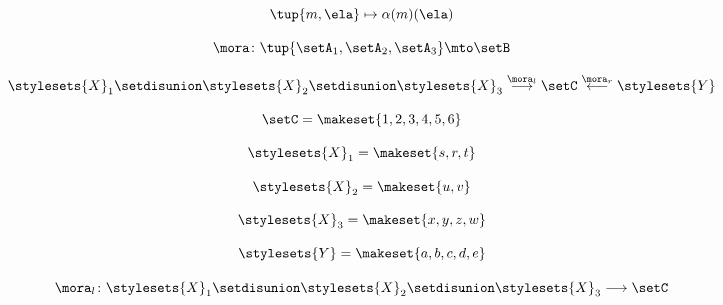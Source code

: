{\begin{forslides}
        \begin{equation}
            \label{eq:slides_multicategories_54}
            \tup{m, \ela} \mapsto \alpha(m)(\ela)
        \end{equation}

        \begin{equation}
            \label{eq:slides_multicategories_55}
            \mora \colon \tup{\setA_1, \setA_2, \setA_3} \mto \setB
        \end{equation}

        \begin{equation}
            \label{eq:slides_multicategories_56}
            \stylesets{X}_1 \setdisunion  \stylesets{X}_2 \setdisunion  \stylesets{X}_3 \overset{\mora_l}{\longrightarrow} \setC \overset{\mora_r}{\longleftarrow}  \stylesets{Y}
        \end{equation}

        \begin{equation}
            \label{eq:slides_multicategories_57}
            \setC = \makeset{1, 2, 3, 4, 5, 6}
        \end{equation}

        \begin{equation}
            \label{eq:slides_multicategories_58}
            \stylesets{X}_1 = \makeset{ s, r, t }
        \end{equation}

        \begin{equation}
            \label{eq:slides_multicategories_59}
            \stylesets{X}_2 = \makeset{ u, v }
        \end{equation}

        \begin{equation}
            \label{eq:slides_multicategories_60}
            \stylesets{X}_3 = \makeset{ x, y, z, w }
        \end{equation}

        \begin{equation}
            \label{eq:slides_multicategories_61}
            \stylesets{Y} = \makeset{ a, b, c, d, e }
        \end{equation}

        \begin{equation}
            \label{eq:slides_multicategories_62}
            \mora_l \colon \stylesets{X}_1 \setdisunion  \stylesets{X}_2 \setdisunion  \stylesets{X}_3 \longrightarrow \setC
        \end{equation}


\end{forslides}}
